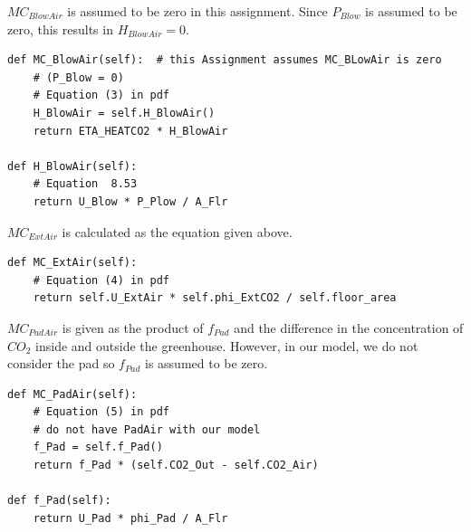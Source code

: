 \documentclass[a4paper]{article}
\numberwithin{equation}{section}
\begin{document}
\(MC_{BlowAir}\) is assumed to be zero in this assignment.
Since \(P_{Blow}\) is assumed to be zero, this results in \(H_{BlowAir} = 0\).
\begin{mdframed}[leftline=false,rightline=false,backgroundcolor=magenta!10,nobreak=true]
  \begin{verbatim}
def MC_BlowAir(self):  # this Assignment assumes MC_BLowAir is zero
    # (P_Blow = 0)
    # Equation (3) in pdf
    H_BlowAir = self.H_BlowAir()
    return ETA_HEATCO2 * H_BlowAir
    
def H_BlowAir(self):
    # Equation  8.53
    return U_Blow * P_Plow / A_Flr
  \end{verbatim}
\end{mdframed}

\(MC_{ExtAir}\) is calculated as the equation given above.
\begin{mdframed}[leftline=false,rightline=false,backgroundcolor=magenta!10,nobreak=true]
  \begin{verbatim}
def MC_ExtAir(self):
    # Equation (4) in pdf
    return self.U_ExtAir * self.phi_ExtCO2 / self.floor_area
  \end{verbatim}
\end{mdframed}

\(MC_{PadAir}\) is given as the product of \(f_{Pad}\) and the difference in the concentration of \(CO_2\) inside and outside the greenhouse. However, in our model, we do not consider the pad so \(f_{Pad}\) is assumed to be zero.
\begin{mdframed}[leftline=false,rightline=false,backgroundcolor=magenta!10,nobreak=true]
  \begin{verbatim}
def MC_PadAir(self):
    # Equation (5) in pdf
    # do not have PadAir with our model
    f_Pad = self.f_Pad()
    return f_Pad * (self.CO2_Out - self.CO2_Air)
    
def f_Pad(self):
    return U_Pad * phi_Pad / A_Flr
  \end{verbatim}
\end{mdframed}
\end{document}
